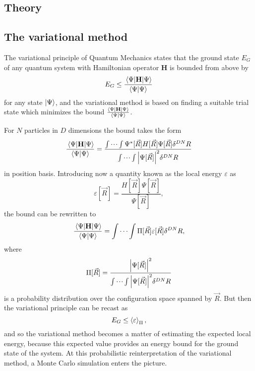 \documentclass[a4paper,8pt]{article}
\begin{document}
\begin{multicols}{2}
\section{Theory} \label{theory}

\subsection{The variational method} \label{varmethod}
The variational principle of Quantum Mechanics states that the ground state $E_G$ of any quantum system with Hamiltonian operator $\mathbf{H}$ is bounded from above by
\begin{equation}
E_G \leq \frac{\ev{\mathbf{H}}{\Psi}}{\braket{\Psi}{\Psi}} \label{varprinciple}
\end{equation}
for any state $\ket{\Psi}$, and the variational method is based on finding a suitable trial state which minimizes the bound $\frac{\ev{\mathbf{H}}{\Psi}}{\braket{\Psi}{\Psi}}$.

For $N$ particles in $D$ dimensions the bound takes the form
\begin{align}
\frac{\ev{\mathbf{H}}{\Psi}}{\braket{\Psi}{\Psi}} = \frac{\idotsint \Psi^*[\vec{R}]H[\vec{R}]\Psi[\vec{R}]\delta^{DN}R}{\idotsint \abs{\Psi[\vec{R}]}^2\delta^{DN}R} \nonumber
\end{align}
in position basis. Introducing now a quantity known as the local energy $\varepsilon$ as
\begin{equation}
\varepsilon[\vec{R}] = \frac{H[\vec{R}]\Psi[\vec{R}]}{\Psi[\vec{R}]}, \label{defLocalenergy}
\end{equation}
the bound can be rewritten to
\begin{equation}
\frac{\ev{\mathbf{H}}{\Psi}}{\braket{\Psi}{\Psi}} = \idotsint \Pi[\vec{R}]\varepsilon[\vec{R}] \delta^{DN}R, \nonumber
\end{equation}
where
\begin{equation}
\Pi[\vec{R}] = \frac{\abs{\Psi[\vec{R}]}^2}{\idotsint \abs{\Psi[\vec{R}]}^2\delta^{DN}R} \label{distribution}
\end{equation}
is a probability distribution over the configuration space spanned by $\vec{R}$. But then the variational principle can be recast as
\begin{equation}
E_G \leq \ev{\varepsilon}_\Pi,
\end{equation}
and so the variational method becomes a matter of estimating the expected local energy, because this expected value provides an energy bound for the ground state of the system. At this probabilistic reinterpretation of the variational method, a Monte Carlo simulation enters the picture.


\end{multicols}
\end{document}
